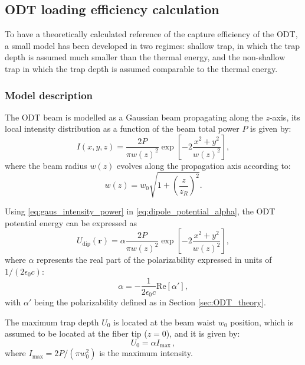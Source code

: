 \subsection{ODT loading efficiency calculation}\label{sec:odt_efficiency_models}
To have a theoretically calculated reference of the capture efficiency of the ODT, a small model has been developed in two regimes: shallow trap, in which the trap depth is assumed much smaller than the thermal energy, and the non-shallow trap in which the trap depth is assumed comparable to the thermal energy.

\subsubsection{Model description}
The ODT beam is modelled as a Gaussian beam propagating along the $z$-axis, its local intensity distribution as a function of the beam total power $P$ is given by:
\begin{equation}
    \label{eq:gaus_intensity_power}
    I(x,y,z) = \frac{2P}{\pi w(z)^2} \exp\left[ -2\frac{x^2+y^2}{w(z)^2} \right],
\end{equation}
where the beam radius $w(z)$ evolves along the propagation axis according to:
\begin{equation}
    w(z) = w_0 \sqrt{1 + \left(\frac{z}{z_R}\right)^2}.
\end{equation}

Using \eqref{eq:gaus_intensity_power} in \eqref{eq:dipole_potential_alpha}, the ODT potential energy can be expressed as
\begin{equation}
    U_\text{dip}(\mathbf{r}) = \alpha \frac{2P}{\pi w(z)^2} \exp\left[ -2\frac{x^2+y^2}{w(z)^2} \right],
\end{equation}
where $\alpha$ represents the real part of the polarizability expressed in units of $1/(2\epsilon_0c)$:
\begin{equation}
    \alpha = -\frac{1}{2\epsilon_0c}\text{Re}[\alpha'],
\end{equation}
with $\alpha'$ being the polarizability defined as in Section \ref{sec:ODT_theory}.

The maximum trap depth $U_0$ is located at the beam waist $w_0$ position, which is assumed to be located at the fiber tip ($z=0$), and it is given by:
\begin{equation}
    U_0 =\alpha I_{\text{max}}\,,
\end{equation}
where $I_{\text{max}} = 2P/(\pi w_0^2)$ is the maximum intensity.

